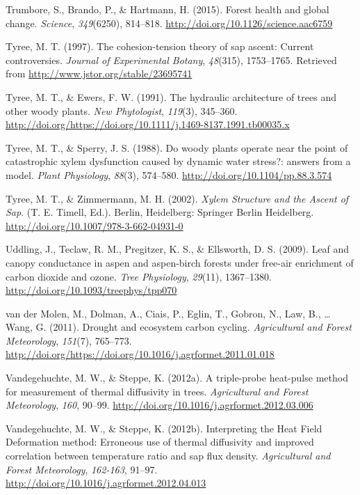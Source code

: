 \documentclass[11pt,twoside]{reedthesis}
\begin{document}
\hypertarget{ref-trumbore_forest_2015}{}
Trumbore, S., Brando, P., \& Hartmann, H. (2015). Forest health and
global change. \emph{Science}, \emph{349}(6250), 814--818.
\url{http://doi.org/10.1126/science.aac6759}

\hypertarget{ref-Tyree1997}{}
Tyree, M. T. (1997). The cohesion-tension theory of sap ascent: Current
controversies. \emph{Journal of Experimental Botany}, \emph{48}(315),
1753--1765. Retrieved from \url{http://www.jstor.org/stable/23695741}

\hypertarget{ref-TyreeEwers1991}{}
Tyree, M. T., \& Ewers, F. W. (1991). The hydraulic architecture of
trees and other woody plants. \emph{New Phytologist}, \emph{119}(3),
345--360.
\url{http://doi.org/https://doi.org/10.1111/j.1469-8137.1991.tb00035.x}

\hypertarget{ref-tyree_woody_1988}{}
Tyree, M. T., \& Sperry, J. S. (1988). Do woody plants operate near the
point of catastrophic xylem dysfunction caused by dynamic water stress?:
answers from a model. \emph{Plant Physiology}, \emph{88}(3), 574--580.
\url{http://doi.org/10.1104/pp.88.3.574}

\hypertarget{ref-tyree_xylem_2002}{}
Tyree, M. T., \& Zimmermann, M. H. (2002). \emph{Xylem Structure and the
Ascent of Sap}. (T. E. Timell, Ed.). Berlin, Heidelberg: Springer Berlin
Heidelberg. \url{http://doi.org/10.1007/978-3-662-04931-0}

\hypertarget{ref-Uddling2009}{}
Uddling, J., Teclaw, R. M., Pregitzer, K. S., \& Ellsworth, D. S.
(2009). Leaf and canopy conductance in aspen and aspen-birch forests
under free-air enrichment of carbon dioxide and ozone. \emph{Tree
Physiology}, \emph{29}(11), 1367--1380.
\url{http://doi.org/10.1093/treephys/tpp070}

\hypertarget{ref-Vandermolen2011}{}
van der Molen, M., Dolman, A., Ciais, P., Eglin, T., Gobron, N., Law,
B., \ldots{} Wang, G. (2011). Drought and ecosystem carbon cycling.
\emph{Agricultural and Forest Meteorology}, \emph{151}(7), 765--773.
\url{http://doi.org/https://doi.org/10.1016/j.agrformet.2011.01.018}

\hypertarget{ref-Vandegehuchte2012}{}
Vandegehuchte, M. W., \& Steppe, K. (2012a). A triple-probe heat-pulse
method for measurement of thermal diffusivity in trees.
\emph{Agricultural and Forest Meteorology}, \emph{160}, 90--99.
\url{http://doi.org/10.1016/j.agrformet.2012.03.006}

\hypertarget{ref-Vandegehuchte2012a}{}
Vandegehuchte, M. W., \& Steppe, K. (2012b). Interpreting the Heat Field
Deformation method: Erroneous use of thermal diffusivity and improved
correlation between temperature ratio and sap flux density.
\emph{Agricultural and Forest Meteorology}, \emph{162-163}, 91--97.
\url{http://doi.org/10.1016/j.agrformet.2012.04.013}
\end{document}
